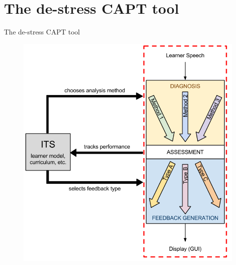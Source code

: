 \documentclass[xcolor={dvipsnames}]{beamer}
\newcommand{\TODO}[1]{{\color{red}\textbf{[TODO #1]}}}
\begin{document}
	
\section{The de-stress CAPT tool }
		
		\begin{frame}{The de-stress CAPT tool}
		\begin{figure}
		\includegraphics[height=.85\textheight]{../img/hourglass-ITS}
		\end{figure}
		\end{frame}
		
\end{document}
